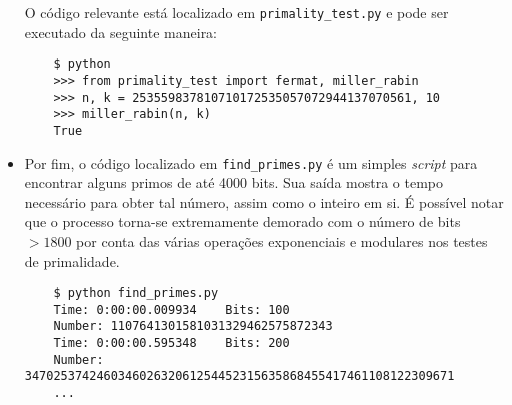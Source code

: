 \documentclass{../sftex/sftex}
\begin{document}
\begin{itemize}
O código relevante está localizado em \verb!primality_test.py! e pode ser
executado da seguinte maneira:

\begin{verbatim}
    $ python
    >>> from primality_test import fermat, miller_rabin
    >>> n, k = 253559837810710172535057072944137070561, 10
    >>> miller_rabin(n, k)
    True
\end{verbatim}

\item Por fim, o código localizado em \verb!find_primes.py! é um simples
\emph{script} para encontrar alguns primos de até 4000 bits. Sua saída mostra
o tempo necessário para obter tal número, assim como o inteiro em si. É
possível notar que o processo torna-se extremamente demorado com o número de
bits $> 1800$ por conta das várias operações exponenciais e modulares nos
testes de primalidade.

\begin{verbatim}
    $ python find_primes.py
    Time: 0:00:00.009934    Bits: 100
    Number: 1107641301581031329462575872343
    Time: 0:00:00.595348    Bits: 200
    Number: 347025374246034602632061254452315635868455417461108122309671
    ...
\end{verbatim}

\end{itemize}



\end{document}
